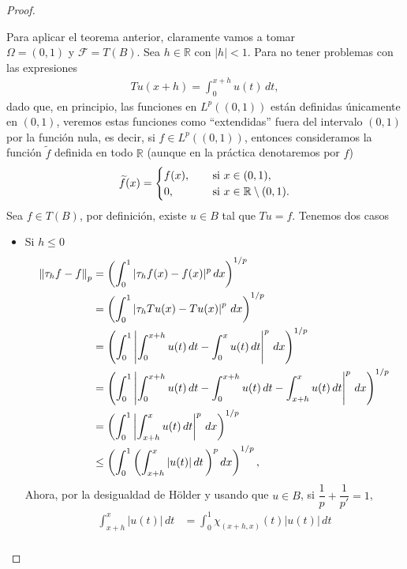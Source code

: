 \begin{proof}
\begin{enumerate}
        Para aplicar el teorema anterior, claramente vamos a tomar\\ $\Omega=(0,1)$ y $\mathcal{F}=T(B)$. Sea $h \in \mathbb{R}$ con $|h|<1$. Para no tener problemas con las expresiones
        \begin{align*}
            Tu(x+h)=\int_{0}^{x+h}u(t)\, dt,
        \end{align*}
        dado que, en principio, las funciones en $L^p((0,1))$ están definidas únicamente en $(0,1)$, veremos estas funciones como ``extendidas'' fuera del intervalo $(0,1)$ por la función nula, es decir, si $f\in L^p((0,1))$, entonces consideramos la función $\widetilde{f}$ definida en todo $\mathbb{R}$ (aunque en la práctica denotaremos por $f$)
        \begin{align*}
            \widetilde{f}(x)=\begin{cases}
                f(x), \hspace{3mm} &\text{ si } x\in (0,1),\\
                0, &\text{ si } x \in \mathbb{R}\setminus(0,1).
            \end{cases}
        \end{align*}
        Sea $f \in T(B)$, por definición, existe $u \in B$ tal que $Tu=f$. Tenemos dos casos
        \begin{itemize}
            \item Si $h\leq 0$
            \begin{align*}
                \left\|\tau_h f-f\right\|_p&=\left(\int_0^1|\tau_h f(x)-f(x)|^p\, dx\right)^{1/p}\\
                &=\left(\int_0^1\left|\tau_h Tu(x)-Tu(x)\right|^p\, dx\right)^{1/p}\\
                &=\left(\int_0^1 \left|\int_0^{x+h}u(t)\, dt-\int_0^xu(t)\, dt\right|^p\, dx\right)^{1/p}\\
                &=\left(\int_0^1 \left|\int_0^{x+h}u(t)\, dt-\int_0^{x+h}u(t)\, dt-\int_{x+h}^x u(t)\, dt\right|^p\, dx\right)^{1/p}\\
                &=\left(\int_0^1\left|\int_{x+h}^x u(t)\, dt\right|^p\, dx\right)^{1/p}\\
                &\leq \left(\int_0^1\left(\int_{x+h}^x |u(t)|\, dt\, \right)^pdx\right)^{1/p},
            \end{align*}
            Ahora, por la desigualdad de Hölder y usando que $u \in B$, si $\dfrac{1}{p}+\dfrac{1}{p'}=1$, 
            \begin{align*}
                \int_{x+h}^x|u(t)|\, dt&=\int_0^1 \chi_{(x+h,x)}(t)|u(t)|\, dt\\

\end{align*}
\end{itemize}
\end{enumerate}
\end{proof}
